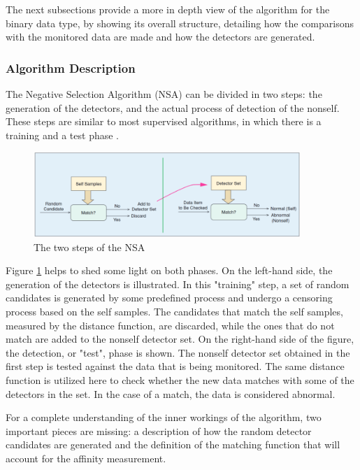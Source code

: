 The next subsections provide a more in depth view of the algorithm for the binary data type, by showing its overall structure, detailing how the comparisons with the monitored data are made and how the detectors are generated. 


\subsubsection{Algorithm Description} \label{sec:bgNSAOverview}

The Negative Selection Algorithm (NSA) can be divided in two steps: the generation of the detectors, and the actual process of detection of the nonself. These steps are similar to most supervised algorithms, in which there is a training and a test phase \cite{NSAResearch2021}. 

\begin{figure}[!h]
	\centering
	\includegraphics[width=0.9\textwidth, keepaspectratio]{img/NSA.png}
	\caption{The two steps of the NSA~ \cite{NSAResearch2021} }
	\label{fig:NSAOverview}
\end{figure}

Figure \ref{fig:NSAOverview} helps to shed some light on both phases. On the left-hand side, the generation of the detectors is illustrated. In this "training" step, a set of random candidates is generated by some predefined process and undergo a censoring process based on the self samples. The candidates that match the self samples, measured by the distance function, are discarded, while the ones that do not match are added to the nonself detector set. On the right-hand side of the figure, the detection, or "test", phase is shown. The nonself detector set obtained in the first step is tested against the data that is being monitored. The same distance function is utilized here to check whether the new data matches with some of the detectors in the set. In the case of a match, the data is considered abnormal.

For a complete understanding of the inner workings of the algorithm, two important pieces are missing: a description of how the random detector candidates are generated and the definition of the matching function that will account for the affinity measurement.

